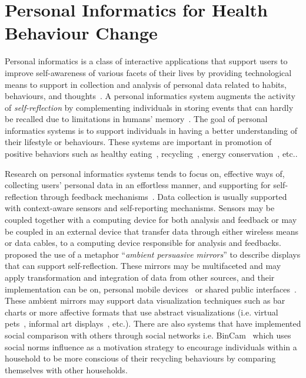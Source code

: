 \section{Personal Informatics for Health Behaviour Change}
Personal informatics is a class of interactive applications that support users to improve self-awareness of various facets of their lives by providing technological means to support in collection and analysis of personal data related to habits, behaviours, and thoughts~\citep{li2011personal,li2012personal}. A personal informatics system augments the activity of \emph{self-reflection} by complementing individuals in storing events that can hardly be recalled due to limitations in humans' memory~\citep{li2010stage}. The goal of personal informatics systems is to support individuals in having a better understanding of their lifestyle or behaviours. These systems are important in promotion of positive behaviors such as healthy eating~\citep{lee2006pmeb}, recycling~\citep{comber2013designing}, energy conservation~\citep{seligman1977feedback}, etc..

Research on personal informatics systems tends to focus on, effective ways of, collecting users' personal data in an effortless manner, and supporting for self-reflection through feedback mechanisms~\citep{li2011understanding}. Data collection is usually supported with context-aware sensors and self-reporting mechanisms. Sensors may be coupled together with a computing device for both analysis and feedback or may be coupled in an external device that transfer data through either wireless means or data cables, to a computing device responsible for analysis and feedbacks.~\cite{nakajima2013designing} proposed the use of a metaphor ``\emph{ambient persuasive mirrors}'' to describe displays that can support self-reflection. These mirrors may be multifaceted and may apply transformation and integration of data from other sources, and their implementation can be on, personal mobile devices~\citep{klasnja2009:using} or shared public interfaces~\citep{lin2006:fish}. These ambient mirrors may support data visualization techniques such as bar charts or more affective formats that use abstract visualizations (i.e. virtual pets~\citep{}, informal art displays~\citep{fan2012spark}, etc.). There are also systems that have implemented social comparison with others through social networks i.e. BinCam~\citep{comber2013bincam,comber2013designing} which uses social norms influence as a motivation strategy to encourage individuals within a household to be more conscious of their recycling behaviours by comparing themselves with other households.

